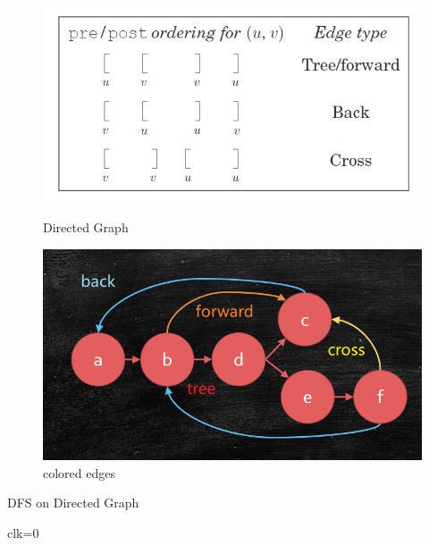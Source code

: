 \documentclass{article}
\begin{document}
\begin{figure}[htbp]
	\centering
	\begin{minipage}{0.5\linewidth}
		\centering
		\includegraphics[width=0.8\linewidth]{fig/edgeType.png}
		\caption{Directed Graph}
        \label{fig:edgeGraph}
    	\end{minipage}
	\begin{minipage}{0.4\linewidth}
		\centering
		\includegraphics[width=0.8\linewidth]{fig/edgeTypeFigure.png}
		\caption{colored edges}
		\label{fig:colored}%
	\end{minipage}
\end{figure}
\begin{algorithm}
    \caption{DFS on Directed Graph}
    \label{alg:dfs}
    clk=0\\
\end{algorithm}
\end{document}
